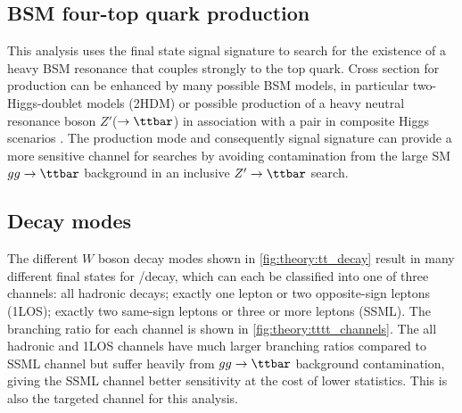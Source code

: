 \documentclass[../thesis.tex]{subfiles}
\begin{document}
\subsection{\acs{BSM} four-top quark production}
\label{sec:4top}
This analysis uses the \tttt final state signal signature to search for the existence of a heavy \acs{BSM} resonance that couples strongly to the top quark. Cross section for \tttt production can be enhanced by many possible \acs{BSM} models, in particular two-Higgs-doublet models (2HDM) \citep{Branco:2011iw,PhysRevD.93.075038,higgscomp} or possible production of a heavy neutral resonance boson $Z'$($\rightarrow\ttbar$) in association with a \ttbar pair in composite Higgs scenarios \citep{Ferretti:2013kya,Vecchi:2015fma}. The \ttZp production mode and consequently \tttt signal signature can provide a more sensitive channel for searches by avoiding contamination from the large \acs{SM} $gg\rightarrow \ttbar$ background in an inclusive $Z'\rightarrow\ttbar$ search.

\subsection*{Decay modes}
The different $W$ boson decay modes shown in \autoref{fig:theory:tt_decay} result in many different final states for \ttZp/\tttt decay, which can each be classified into one of three channels: all hadronic decays; exactly one lepton or two opposite-sign leptons (\acs{1LOS}); exactly two same-sign leptons or three or more leptons (\acs{SSML}). The branching ratio for each channel is shown in \autoref{fig:theory:tttt_channels}. The all hadronic and \acs{1LOS} channels have much larger branching ratios compared to \acs{SSML} channel but suffer heavily from $gg\rightarrow\ttbar$ background contamination, giving the \acs{SSML} channel better sensitivity at the cost of lower statistics. This is also the targeted channel for this analysis.
\end{document}
